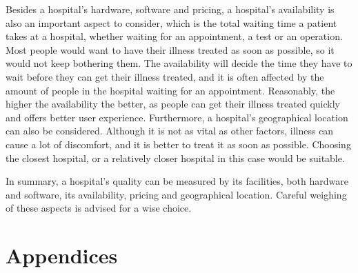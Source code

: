 \documentclass{article}
\begin{document}
Besides a hospital’s hardware, software and pricing, a hospital’s availability is also an important aspect to consider, which is the total waiting time a patient takes at a hospital, whether waiting for an appointment, a test or an operation. Most people would want to have their illness treated as soon as possible, so it would not keep bothering them. The availability will decide the time they have to wait before they can get their illness treated, and it is often affected by the amount of people in the hospital waiting for an appointment. Reasonably, the higher the availability the better, as people can get their illness treated quickly and offers better user experience. Furthermore, a hospital’s geographical location can also be considered. Although it is not as vital as other factors, illness can cause a lot of discomfort, and it is better to treat it as soon as possible. Choosing the closest hospital, or a relatively closer hospital in this case would be suitable.

In summary, a hospital’s quality can be measured by its facilities, both hardware and software, its availability, pricing and geographical location. Careful weighing of these aspects is advised for a wise choice. 
\newpage
\section*{\centering Appendices}
\end{document}

